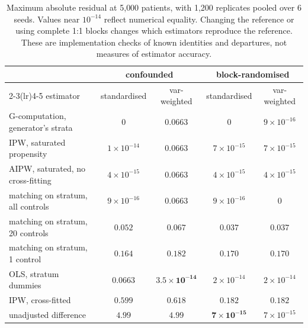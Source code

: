\begin{table}[htbp]
\small
\centering
\caption{Maximum absolute residual at 5{,}000 patients, with 1{,}200 replicates
pooled over 6 seeds. Values near $10^{-14}$ reflect numerical equality.
Changing the reference or using complete 1:1 blocks changes which estimators
reproduce the reference. These are implementation checks of known identities and departures, not
measures of estimator accuracy.}
\label{tab:matrix}
\begin{tabular}{@{}lcccc@{}}
\toprule
& \multicolumn{2}{c}{\textbf{confounded}} & \multicolumn{2}{c}{\textbf{block-randomised}} \\
\cmidrule(lr){2-3}\cmidrule(lr){4-5}
estimator & standardised & var-weighted & standardised & var-weighted \\
\midrule
G-computation, generator's strata & $0$          & $0.0663$     & $0$          & $9\!\times\!10^{-16}$ \\
IPW, saturated propensity         & $1\!\times\!10^{-14}$ & $0.0663$ & $7\!\times\!10^{-15}$ & $7\!\times\!10^{-15}$ \\
AIPW, saturated, no cross-fitting & $4\!\times\!10^{-15}$ & $0.0663$ & $4\!\times\!10^{-15}$ & $4\!\times\!10^{-15}$ \\
matching on stratum, all controls & $9\!\times\!10^{-16}$ & $0.0663$ & $9\!\times\!10^{-16}$ & $0$ \\
matching on stratum, 20 controls  & $0.052$      & $0.067$      & $0.037$      & $0.037$ \\
matching on stratum, 1 control    & $0.164$      & $0.182$      & $0.170$      & $0.170$ \\
OLS, stratum dummies              & $0.0663$     & $\mathbf{3.5\!\times\!10^{-14}}$ & $2\!\times\!10^{-14}$ & $2\!\times\!10^{-14}$ \\
IPW, cross-fitted                 & $0.599$      & $0.618$      & $0.182$      & $0.182$ \\
unadjusted difference             & $4.99$       & $4.99$       & $\mathbf{7\!\times\!10^{-15}}$ & $7\!\times\!10^{-15}$ \\
\bottomrule
\end{tabular}
\end{table}
